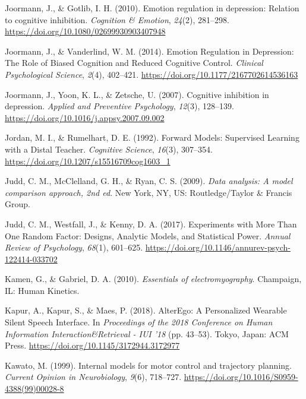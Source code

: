 \documentclass[a4paper,12pt,twoside,onecolumn,openright,final,oldfontcommands]{memoir}
\begin{document}
\leavevmode\hypertarget{ref-joormann_emotion_2010}{}%
Joormann, J., \& Gotlib, I. H. (2010). Emotion regulation in depression: Relation to cognitive inhibition. \emph{Cognition \& Emotion}, \emph{24}(2), 281--298. \url{https://doi.org/10.1080/02699930903407948}

\leavevmode\hypertarget{ref-joormann_emotion_2014}{}%
Joormann, J., \& Vanderlind, W. M. (2014). Emotion Regulation in Depression: The Role of Biased Cognition and Reduced Cognitive Control. \emph{Clinical Psychological Science}, \emph{2}(4), 402--421. \url{https://doi.org/10.1177/2167702614536163}

\leavevmode\hypertarget{ref-joormann_cognitive_2007}{}%
Joormann, J., Yoon, K. L., \& Zetsche, U. (2007). Cognitive inhibition in depression. \emph{Applied and Preventive Psychology}, \emph{12}(3), 128--139. \url{https://doi.org/10.1016/j.appsy.2007.09.002}

\leavevmode\hypertarget{ref-jordan_forward_1992}{}%
Jordan, M. I., \& Rumelhart, D. E. (1992). Forward Models: Supervised Learning with a Distal Teacher. \emph{Cognitive Science}, \emph{16}(3), 307--354. \url{https://doi.org/10.1207/s15516709cog1603_1}

\leavevmode\hypertarget{ref-judd_data_2009}{}%
Judd, C. M., McClelland, G. H., \& Ryan, C. S. (2009). \emph{Data analysis: A model comparison approach, 2nd ed}. New York, NY, US: Routledge/Taylor \& Francis Group.

\leavevmode\hypertarget{ref-judd_experiments_2017}{}%
Judd, C. M., Westfall, J., \& Kenny, D. A. (2017). Experiments with More Than One Random Factor: Designs, Analytic Models, and Statistical Power. \emph{Annual Review of Psychology}, \emph{68}(1), 601--625. \url{https://doi.org/10.1146/annurev-psych-122414-033702}

\leavevmode\hypertarget{ref-kamen_essentials_2010}{}%
Kamen, G., \& Gabriel, D. A. (2010). \emph{Essentials of electromyography}. Champaign, IL: Human Kinetics.

\leavevmode\hypertarget{ref-kapur_alterego_2018}{}%
Kapur, A., Kapur, S., \& Maes, P. (2018). AlterEgo: A Personalized Wearable Silent Speech Interface. In \emph{Proceedings of the 2018 Conference on Human Information Interaction\&Retrieval - IUI '18} (pp. 43--53). Tokyo, Japan: ACM Press. \url{https://doi.org/10.1145/3172944.3172977}

\leavevmode\hypertarget{ref-kawato_internal_1999}{}%
Kawato, M. (1999). Internal models for motor control and trajectory planning. \emph{Current Opinion in Neurobiology}, \emph{9}(6), 718--727. \url{https://doi.org/10.1016/S0959-4388(99)00028-8}
\end{document}
